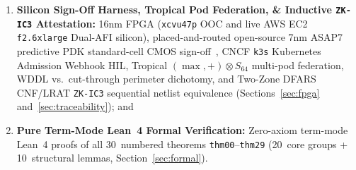 \documentclass[10pt,twocolumn]{article}
\providecommand{\LeanTheoremTotal}{30}
\providecommand{\LeanCoreLoadBearing}{20}
\providecommand{\LeanStructuralLemmas}{10}
\theoremstyle{spectralthm}
\begin{document}
\begin{enumerate}[label=(\arabic*)]
  \item \textbf{Silicon Sign-Off Harness, Tropical Pod Federation, \& Inductive \texttt{ZK-IC3} Attestation:} 16nm FPGA (\texttt{xcvu47p} OOC and live AWS EC2 \texttt{f2.6xlarge} Dual-AFI silicon), placed-and-routed open-source 7nm ASAP7 predictive PDK standard-cell CMOS sign-off~\cite{clark2016asap7}, CNCF \texttt{k3s} Kubernetes Admission Webhook HIL, Tropical $(\max,+) \otimes S_{64}$ multi-pod federation, WDDL vs.\ cut-through perimeter dichotomy, and Two-Zone DFARS CNF/LRAT \texttt{ZK-IC3} sequential netlist equivalence (Sections~\ref{sec:fpga} and~\ref{sec:traceability}); and
  \item \textbf{Pure Term-Mode Lean~4 Formal Verification:} Zero-axiom term-mode Lean~4 proofs of all \LeanTheoremTotal\ numbered theorems \texttt{thm00}--\texttt{thm29} (\LeanCoreLoadBearing\ core groups + \LeanStructuralLemmas\ structural lemmas, Section~\ref{sec:formal}).
\end{enumerate}
\end{document}
